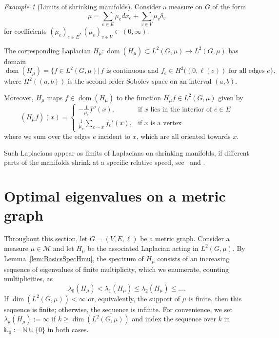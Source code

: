 \documentclass[reqno]{amsart}
\theoremstyle{plain}
\theoremstyle{definition}
\theoremstyle{remark}
\newtheorem{ex}[thm]{Example}
\numberwithin{equation}{section}
\newcommand{\N}{\mathbb{N}}     %
\newcommand{\cM}{\mathcal{M}}
\newcommand{\dom}{\operatorname{dom}}
\begin{document}
\begin{ex}[Limits of shrinking manifolds] Consider a measure on $G$ of the form
\[
\mu = \sum_{e \in E} \mu_e dx_e + \sum_{v \in V} \mu_v \delta_v
\]
for coefficients $(\mu_e)_{e \in E}, (\mu_v)_{v \in V}\subset (0, \infty)$.

The corresponding Laplacian $H_\mu \colon \dom(H_\mu) \subset L^2(G, \mu)  \to L^2(G,\mu)$ has domain
\[
\dom(H_\mu) =  \{f\in L^2(G, \mu)| \, \text{$f$ is continuous and } f_e \in H^2((0, \ell(e)) \text{ for all edges $e$} \},
\]
where $H^2((a,b))$ is the second order Sobolev space on an interval $(a,b)$.

Moreover, $H_\mu$ maps $f \in \dom (H_\mu)$ to the function $H_\mu f \in L^2(G, \mu)$ given by
\[
(H_\mu f)(x) = \begin{cases}
- \frac{1}{\mu_e} f''(x), &\text{if $x$ lies in the interior of $e \in E$} \\
  \frac{1}{\mu_x} \sum_{e \sim x}  f_e'(x), &\text{if $x$ is a vertex}
\end{cases} 
\]
where we sum over the edges $e$ incident to $x$, which are all oriented towards $x$.

Such Laplacians appear as limits of Laplacians on shrinking manifolds, if different parts of the manifolds shrink at a specific relative speed, see~\cite[Section 7]{ep05} and \cite[Section 7.2.3]{post}.

\end{ex}






\section{Optimal eigenvalues on a metric graph} \label{sec:DefinitionEigenvalues}

Throughout this section, let $G = (V,E, \ell)$ be a metric graph. Consider a measure $\mu \in \cM$ and let $H_\mu$ be the associated Laplacian acting in $L^2(G, \mu)$. By Lemma~\ref{lem:BasicsSpecHmu}, the spectrum of $H_\mu$ consists of an increasing sequence of eigenvalues of finite multiplicity, which we enumerate, counting multiplicities, as
\[
\lambda_0(H_\mu) < \lambda_1(H_\mu) \le \lambda_2(H_\mu) \le \dots.
\]
If $\dim(L^2(G, \mu)) < \infty$ or, equivalently, the support of $\mu$ is finite, then this sequence is finite; otherwise, the sequence is infinite. For convenience, we set $\lambda_k(H_\mu) := \infty$ if $k \geq \dim(L^2(G, \mu))$ and index the sequence over $k$ in $\N_0 := \N\cup \{0\}$ in both cases.
\end{document}
